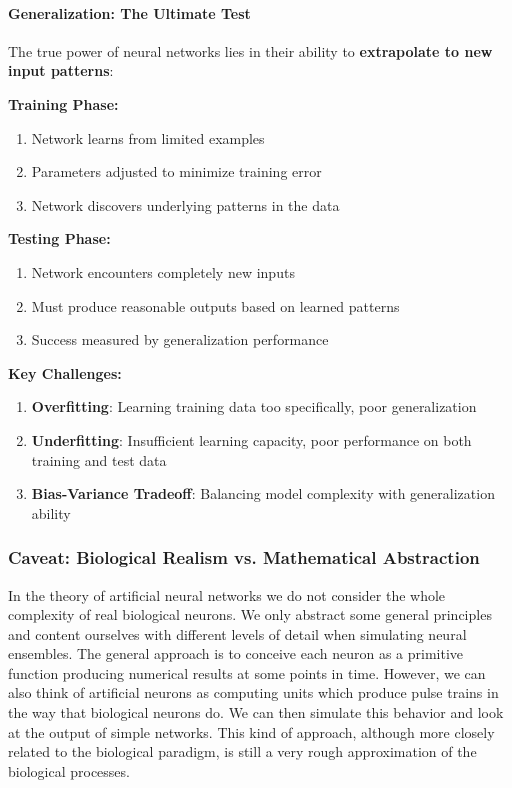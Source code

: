 \paragraph{Generalization: The Ultimate Test}
\label{para:generalization-ultimate-test}

The true power of neural networks lies in their ability to \textbf{extrapolate to new input patterns}:

\textbf{Training Phase:}

\begin{enumerate}
\item Network learns from limited examples
\item Parameters adjusted to minimize training error
\item Network discovers underlying patterns in the data
\end{enumerate}

\textbf{Testing Phase:}

\begin{enumerate}
\item Network encounters completely new inputs
\item Must produce reasonable outputs based on learned patterns
\item Success measured by generalization performance
\end{enumerate}

\textbf{Key Challenges:}

\begin{enumerate}
\item \textbf{Overfitting}: Learning training data too specifically, poor generalization
\item \textbf{Underfitting}: Insufficient learning capacity, poor performance on both training and test data
\item \textbf{Bias-Variance Tradeoff}: Balancing model complexity with generalization ability
\end{enumerate}

\subsubsection{Caveat: Biological Realism vs. Mathematical Abstraction}
\label{subsubsec:biological-realism-vs-abstraction}

In the theory of artificial neural networks we do not consider the whole complexity of real biological neurons. We only abstract some general principles and content ourselves with different levels of detail when simulating neural ensembles. The general approach is to conceive each neuron as a primitive function producing numerical results at some points in time. However, we can also think of artificial neurons as computing units which produce pulse trains in the way that biological neurons do. We can then simulate this behavior and look at the output of simple networks. This kind of approach, although more closely related to the biological paradigm, is still a very rough approximation of the biological processes.

